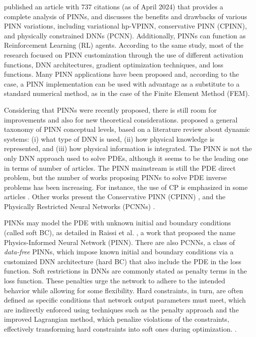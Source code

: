  published an article with 737 citations (as of April 2024) that provides a complete analysis of PINNs, and discusses the benefits and drawbacks of various PINN variations, including variational hp-VPINN, conservative PINN (CPINN), and physically constrained DNNs (PCNN). Additionally, PINNs can function as Reinforcement Learning (RL) agents. According to the same study, most of the research focused on PINN customization through the use of different activation functions, DNN architectures, gradient optimization techniques, and loss functions. Many PINN applications have been proposed and, according to the case, a PINN implementation can be used with advantage as a substitute to a standard numerical method, as in the case of the  Finite Element Method (FEM).

Considering that PINNs were recently proposed, there is still room for improvements and also for new theoretical considerations. 
 proposed a general taxonomy of PINN conceptual levels, based on a literature review about dynamic systems: (i) what type of DNN is used, (ii) how physical knowledge is represented, and (iii) how physical information is integrated. The PINN is not the only DNN approach used to solve PDEs, although it seems to be the leading one in terms of number of articles. The PINN mainstream is still the PDE direct problem, but the number of works proposing PINNs to solve PDE inverse problems has been increasing. For instance, the use of CP is emphasized in some articles \cite{Meng2020,Yang2019,Raissi2019}. Other works present the Conservative PINN (CPINN) \cite{Jagtap2020}, and the Physically Restricted Neural Networks (PCNNs) \cite{Zhu2019,Sun2020,Liu2021}.

PINNs may model the PDE with unknown initial and boundary conditions (called soft BC), as detailed in Raissi et al. \cite{Raissi2019}, a work that proposed the name Physics-Informed Neural Network (PINN). There are also PCNNs, a class of \textit{data-free} PINNs, which impose known initial and boundary conditions via a customized DNN architecture (hard BC) that also include the PDE in the loss function. Soft restrictions in DNNs are commonly stated as penalty terms in the loss function. These penalties urge the network to adhere to the intended behavior while allowing for some flexibility. Hard constraints, in turn, are often defined as specific conditions that network output parameters must meet, which are indirectly enforced using techniques such as the penalty approach and the improved Lagrangian method, which penalize violations of the constraints, effectively transforming hard constraints into soft ones during optimization. \cite{Lu2021b,Nandwani2019,Yao2023}.


